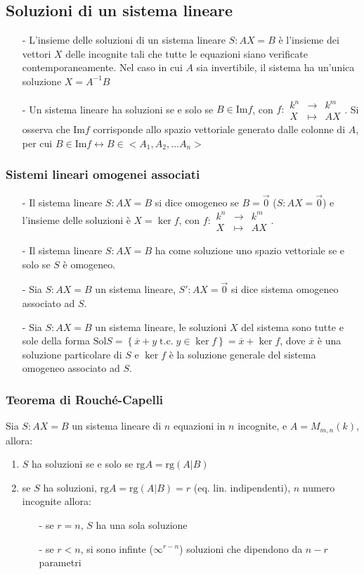 \documentclass[a4paper]{article}
\newcommand\f[4]{\begin{smallmatrix} {#1} &\to &{#2} \\ {#3} &\mapsto &{#4} \end{smallmatrix}}
\newcommand\tc{\;\text{t.c.}\;} %
\newcommand\img{\text{Im}}		%
\newcommand\rg{\text{rg}} 		%
\newcommand\sol{\text{Sol}}		%
\begin{document}
\subsection{Soluzioni di un sistema lineare}
\begin{itemize}
	\item[-] L'insieme delle soluzioni di un sistema lineare \(S : AX = B\) è l'insieme dei vettori \(X\) delle incognite tali che
	tutte le equazioni siano verificate contemporaneamente. Nel caso in cui \(A\) sia invertibile, il sistema ha un'unica soluzione
	\(X = A^{-1} B\)
	\item[-] Un sistema lineare ha soluzioni se e solo se \(B \in \img f\), con \(f: \f{k^n}{k^m}{X}{AX}\). Si osserva che \(\img f\)
	corrisponde allo spazio vettoriale generato dalle colonne di \(A\), per cui \(B \in \img f \leftrightarrow B \in <A_1, A_2, \dots A_n>\) 
\end{itemize}

\subsubsection*{Sistemi lineari omogenei associati}
\begin{itemize}
	\item[-] Il sistema lineare \(S: AX = B\) si dice omogeneo se \(B = \vec{0}\) (\(S:AX = \vec{0}\)) e l'insieme delle soluzioni
	è \(X = \ker f\), con \(f: \f{k^n}{k^m}{X}{AX}\).
	\item[-] Il sistema lineare \(S: AX = B\) ha come soluzione uno spazio vettoriale se e solo se \(S\) è omogeneo.
	\item[-] Sia \(S: AX = B\) un sistema lineare, \(S' : AX = \vec{0}\) si dice sistema omogeneo associato ad \(S\).
	\item[-] Sia \(S: AX = B\) un sistema lineare, le soluzioni \(X\) del sistema sono tutte e sole della forma
	\(\sol S = \left\{ \overline{x} + y \tc y \in \ker f \right\} = \overline{x} + \ker f\), dove \(\overline{x}\) è una soluzione
	particolare di \(S\) e \(\ker f\) è la soluzione generale del sistema omogeneo associato ad \(S\).
\end{itemize}

\subsubsection*{Teorema di Rouché-Capelli}
Sia \(S: AX = B\) un sistema lineare di \(n\) equazioni in \(n\) incognite, e \(A = M_{m,n}(k)\), allora:
\begin{enumerate}
	\item \(S\) ha soluzioni se e solo se \(\rg A = \rg (A|B)\)
	\item se \(S\) ha soluzioni, \(\rg A = \rg (A|B) = r\) (eq. lin. indipendenti), \(n\) numero incognite allora:
	\begin{itemize}
		\item[-] se \(r = n\), \(S\) ha una sola soluzione
		\item[-] se \(r < n\), si sono infinte (\(\infty^{r-n}\)) soluzioni che dipendono da \(n-r\) parametri
	\end{itemize}
\end{enumerate}
\end{document}
